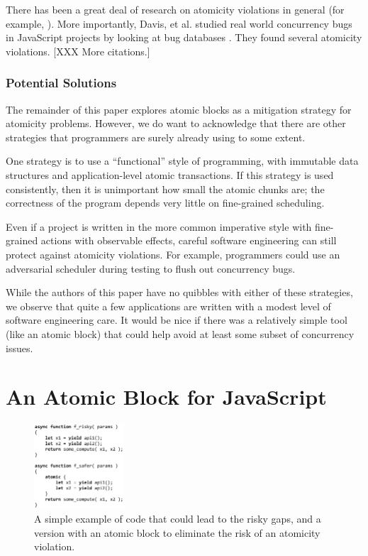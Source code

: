 \documentclass[acmsmall,anonymous,review]{acmart}\settopmatter{printfolios=true,printccs=false,printacmref=false}
\begin{document}
There has been a great deal of research on atomicity violations in general (for example, \cite{Lu2008}).
More importantly, Davis, et al. studied real world concurrency bugs in JavaScript projects by looking at bug databases \cite{Davis2017}.
They found several atomicity violations.
[XXX More citations.]

\subsubsection{Potential Solutions}

The remainder of this paper explores atomic blocks as a mitigation strategy for atomicity problems.
However, we do want to acknowledge that there are other strategies that programmers are surely already using to some extent.

One strategy is to use a ``functional'' style of programming, with immutable data structures and application-level atomic transactions.
If this strategy is used consistently, then it is unimportant how small the atomic chunks are; the correctness of the program depends very little on fine-grained scheduling.

Even if a project is written in the more common imperative style with fine-grained actions with observable effects, careful software engineering can still protect against atomicity violations.
For example, programmers could use an adversarial scheduler during testing to flush out concurrency bugs.

While the authors of this paper have no quibbles with either of these strategies, we observe that quite a few applications are written with a modest level of software engineering care.
It would be nice if there was a relatively simple tool (like an atomic block) that could help avoid at least some subset of concurrency issues.

\section{An Atomic Block for JavaScript}

\begin{figure}
\includegraphics[width=0.3\textwidth,left]{async_atomic_js}
\caption{A simple example of code that could lead to the risky gaps, and a version with an atomic block to eliminate the risk of an atomicity violation.}
\label{fig:async_atomic_js}
\end{figure}
\end{document}
